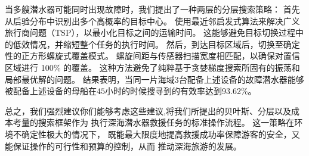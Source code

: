 \documentclass{mcmthesis}
\begin{document}
当多艘潜水器可能同时出现故障时，我们提出了一种两层的分层搜索策略：
首先从后验分布中识别出多个高概率的目标中心。
使用最近邻启发式算法来解决广义旅行商问题（TSP），以最小化目标之间的运输时间。
这能够避免目标切换过程中的低效情况，并缩短整个任务的执行时间。
然后，到达目标区域后，切换至确定性的正方形螺旋式覆盖模式。
螺旋间距与传感器扫描宽度相匹配，以确保对置信区域进行 100\% 的覆盖。
这种方法避免了纯粹基于贪婪梯度搜索所固有的振荡和局部最优解的问题。
结果表明，当同一片海域3台配备上述设备的故障潜水器能够
被配备上述设备的母船在$45$小时的时候搜寻到的有效率达到93.62\%。


总之，我们强烈建议你们能够考虑这些建议,将我们所提出的贝叶斯、分层以及成本考量的搜索框架作为
执行深海潜水器救援任务的标准操作流程。
这一策略在环境不确定性极大的情况下，
既能最大限度地提高救援成功率保障游客的安全，又能保证操作的可行性和预算的控制，从而
推动深海旅游的发展。


\vspace{0.3cm}
\end{document}
